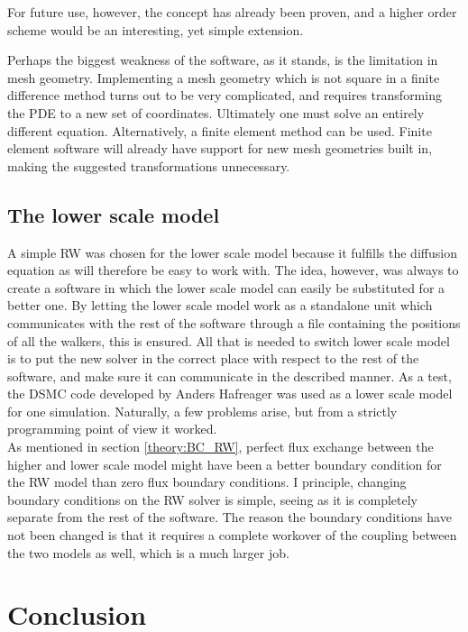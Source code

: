 For future use, however, the concept has already been proven, and a higher order scheme would be an interesting, yet simple extension.

Perhaps the biggest weakness of the software, as it stands, is the limitation in mesh geometry. 
Implementing a mesh geometry which is not square in a finite difference method turns out to be very complicated, and requires transforming the PDE to a new set of coordinates. 
Ultimately one must solve an entirely different equation. 
Alternatively, a finite element method can be used. 
Finite element software will already have support for new mesh geometries built in, making the suggested transformations unnecessary.

\subsection{The lower scale model}

A simple RW was chosen for the lower scale model because it fulfills the diffusion equation as will therefore be easy to work with. 
The idea, however, was always to create a software in which the lower scale model can easily be substituted for a better one. 
By letting the lower scale model work as a standalone unit which communicates with the rest of the software through a file containing the positions of all the walkers, this is ensured. 
All that is needed to switch lower scale model is to put the new solver in the correct place with respect to the rest of the software, and make sure it can communicate in the described manner. 
As a test, the DSMC code developed by Anders Hafreager was used as a lower scale model for one simulation. 
Naturally, a few problems arise, but from a strictly programming point of view it worked. \\

As mentioned in section \ref{theory:BC_RW}, perfect flux exchange between the higher and lower scale model might have been a better boundary condition for the RW model than zero flux boundary conditions. 
I principle, changing boundary conditions on the RW solver is simple, seeing as it is completely separate from the rest of the software. 
The reason the boundary conditions have not been changed is that it requires a complete workover of the coupling between the two models as well, which is a much larger job. 



\section{Conclusion}
